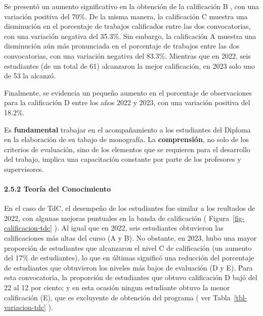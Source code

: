 \documentclass[
  letterpaper,
  DIV=11,
  numbers=noendperiod]{scrartcl}
\let\oldparagraph\paragraph
\renewcommand{\paragraph}[1]{\oldparagraph{#1}\mbox{}}
\begin{document}
Se presentó un aumento significativo en la obtención de la calificación
B , con una variación positiva del 70\%. De la misma manera, la
calificación C muestra una disminución en el porcentaje de trabajos
calificados entre las dos convocatorias, con una variación negativa del
35.3\%. Sin embargo, la calificación A muestra una disminución aún más
pronunciada en el porcentaje de trabajos entre las dos convocatorias,
con una variación negativa del 83.3\%. Mientras que en 2022, seis
estudiantes (de un total de 61) alcanzaron la mejor calificación, en
2023 solo uno de 53 la alcanzó.

Finalmente, se evidencia un pequeño aumento en el porcentaje de
observaciones para la calificación D entre los años 2022 y 2023, con una
variación positiva del 18.2\%.

\begin{tcolorbox}[enhanced jigsaw, colbacktitle=quarto-callout-important-color!10!white, toprule=.15mm, colback=white, toptitle=1mm, leftrule=.75mm, rightrule=.15mm, left=2mm, arc=.35mm, colframe=quarto-callout-important-color-frame, breakable, bottomtitle=1mm, titlerule=0mm, opacityback=0, title=\textcolor{quarto-callout-important-color}{\faExclamation}\hspace{0.5em}{Importante}, coltitle=black, opacitybacktitle=0.6, bottomrule=.15mm]
Es \textbf{fundamental} trabajar en el acompañamiento a los estudiantes
del Diploma en la elaboración de su tabajo de monografía. La
\textbf{comprensión}, no solo de los criterios de evaluación, sino de
los elementos que se requieren para el desarrollo del trabajo, implica
una capacitación constante por parte de los profesores y supervisores.
\end{tcolorbox}

\hypertarget{teoruxeda-del-conocimiento}{%
\paragraph{2.5.2 Teoría del
Conocimiento}\label{teoruxeda-del-conocimiento}}

En el caso de TdC, el desempeño de los estudiantes fue similar a los
reultados de 2022, con algunas mejoras puntuales en la banda de
calificación ( Figura~\ref{fig-calificacion-tdc} ). Al igual que en
2022, seis estudiantes obtuvieron las calificaciones más altas del curso
(A y B). No obstante, en 2023, hubo una mayor proporción de estudiantes
que alcanzaron el nivel C de calificación (un aumento del 17\% de
estudiantes), lo que en últimas significó una reducción del porcentaje
de estudiantes que obtuvieron los niveles más bajos de evaluación (D y
E). Para esta convocatoria, la proporción de estudiantes que obtuvo
calificación D bajó del 22 al 12 por ciento; y en esta ocasión ningun
estudiante obtuvo la menor calificación (E), que es excluyente de
obtención del programa ( ver Tabla~\ref{tbl-variacion-tdc} ).
\end{document}
